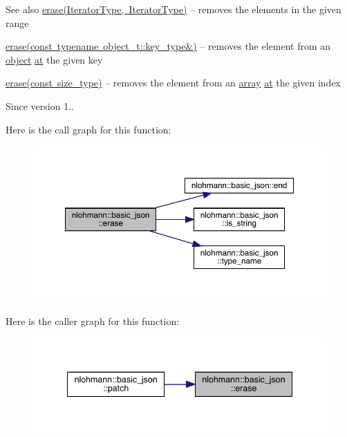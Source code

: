 \begin{DoxySeeAlso}{See also}
\mbox{\hyperlink{classnlohmann_1_1basic__json_a4b3f7eb2d4625d95a51fbbdceb7c5f39}{erase(\+Iterator\+Type, Iterator\+Type)}} -- removes the elements in the given range 

\mbox{\hyperlink{classnlohmann_1_1basic__json_a2f8484d69c55d8f2a9697a7bec29362a}{erase(const typename object\+\_\+t\+::key\+\_\+type\&)}} -- removes the element from an \mbox{\hyperlink{classnlohmann_1_1basic__json_a9f42ee7d10eee2d5a73fd94ca7f767ca}{object}} \mbox{\hyperlink{classnlohmann_1_1basic__json_a73ae333487310e3302135189ce8ff5d8}{at}} the given key 

\mbox{\hyperlink{classnlohmann_1_1basic__json_a88cbcefe9a3f4d294bed0653550a5cb9}{erase(const size\+\_\+type)}} -- removes the element from an \mbox{\hyperlink{classnlohmann_1_1basic__json_a4a4ec75e4d2845d9bcf7a9e5458e4949}{array}} \mbox{\hyperlink{classnlohmann_1_1basic__json_a73ae333487310e3302135189ce8ff5d8}{at}} the given index
\end{DoxySeeAlso}
\begin{DoxySince}{Since}
version 1.. 
\end{DoxySince}
Here is the call graph for this function\+:\nopagebreak
\begin{figure}[H]
\begin{center}
\leavevmode
\includegraphics[width=350pt]{classnlohmann_1_1basic__json_a068a16e76be178e83da6a192916923ed_cgraph}
\end{center}
\end{figure}
Here is the caller graph for this function\+:\nopagebreak
\begin{figure}[H]
\begin{center}
\leavevmode
\includegraphics[width=341pt]{classnlohmann_1_1basic__json_a068a16e76be178e83da6a192916923ed_icgraph}
\end{center}
\end{figure}
